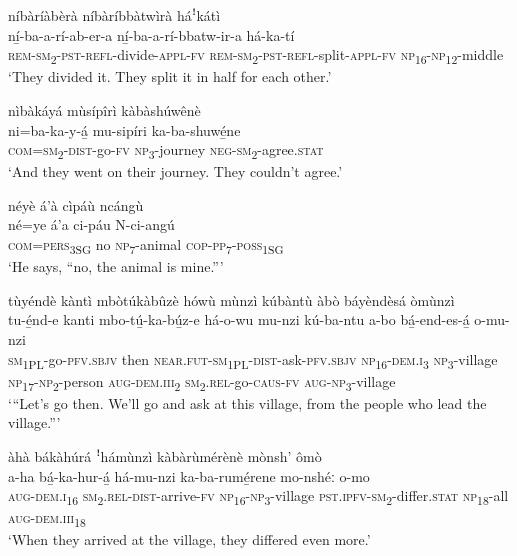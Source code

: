 níbàríàbèrà níbàríbbàtwìrà háꜝkátì\\
\gll ní̲-ba-a-rí-ab-er-a ní̲-ba-a-rí-bbatw-ir-a      há-ka-tí \\
\textsc{rem}{}-\textsc{sm}\textsubscript{2}{}-\textsc{pst}{}-\textsc{refl}{}-divide-\textsc{appl}{}-\textsc{fv}
\textsc{rem}{}-\textsc{sm}\textsubscript{2}{}-\textsc{pst}{}-\textsc{refl}{}-split-\textsc{appl}{}-\textsc{fv}   \textsc{np}\textsubscript{16}{}-\textsc{np}\textsubscript{12}{}-middle\\
\glt ‘They divided it. They split it in half for each other.’\bigskip

nìbàkáyá mùsípîrì kàbàshúwênè\\
\gll ni=ba-ka-y-á̲      mu-sipíri  ka-ba-shuwé̲ne\\
\textsc{com}=\textsc{sm}\textsubscript{2}{}-\textsc{dist}{}-go-\textsc{fv}  \textsc{np}\textsubscript{3}{}-journey  \textsc{neg}{}-\textsc{sm}\textsubscript{2}{}-agree.\textsc{stat}\\
\glt ‘And they went on their journey. They couldn’t agree.’\bigskip

néyè á’à cìpáù ncángù \\
\gll né=ye    á’a  ci-páu    N-ci-angú\\
\textsc{com}=\textsc{pers}\textsubscript{3SG} no  \textsc{np}\textsubscript{7}{}-animal  \textsc{cop}{}-\textsc{pp}\textsubscript{7}{}-\textsc{poss}\textsubscript{1SG}\\
\glt ‘He says, “no, the animal is mine.”’\bigskip

tùyéndè kàntì mbòtúkàbûzè hówù mùnzì kúbàntù àbò báyèndèsá òmùnzì\\
\gll tu-é̲nd-e    kanti  mbo-tú̲-ka-bú̲z-e há-o-wu  mu-nzi  kú-ba-ntu    a-bo    bá̲-end-es-á̲      o-mu-nzi\\
\textsc{sm}\textsubscript{1PL}{}-go-\textsc{pfv}.\textsc{sbjv}  then  \textsc{near}.\textsc{fut}{}-\textsc{sm}\textsubscript{1PL}{}-\textsc{dist}{}-ask-\textsc{pfv}.\textsc{sbjv}
\textsc{np}\textsubscript{16}{}-\textsc{dem}.\textsc{i}\textsubscript{3}  \textsc{np}\textsubscript{3}{}-village
\textsc{np}\textsubscript{17}{}-\textsc{np}\textsubscript{2}{}-person  \textsc{aug}{}-\textsc{dem}.\textsc{iii}\textsubscript{2}  \textsc{sm}\textsubscript{2}.\textsc{rel}{}-go-\textsc{caus}{}-\textsc{fv}  \textsc{aug}{}-\textsc{np}\textsubscript{3}{}-village\\
\glt ‘“Let’s go then. We’ll go and ask at this village, from the people who lead the village.”’\bigskip

àhà bákàhúrá ꜝhámùnzì kàbàrùmérènè mònsh’ ômò\\
\gll a-ha    bá̲-ka-hur-á̲      há-mu-nzi ka-ba-rumé̲rene    mo-nshéː  o-mo \\
\textsc{aug}{}-\textsc{dem}.\textsc{i}\textsubscript{16}  \textsc{sm}\textsubscript{2}.\textsc{rel}{}-\textsc{dist}{}-arrive-\textsc{fv}  \textsc{np}\textsubscript{16}{}-\textsc{np}\textsubscript{3}{}-village
\textsc{pst}.\textsc{ipfv}{}-\textsc{sm}\textsubscript{2}{}-differ.\textsc{stat}  \textsc{np}\textsubscript{18}{}-all  \textsc{aug}{}-\textsc{dem}.\textsc{iii}\textsubscript{18}\\
\glt ‘When they arrived at the village, they differed even more.’\bigskip

